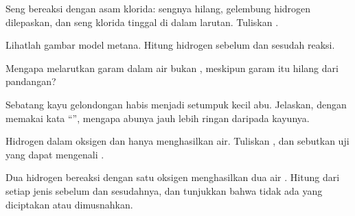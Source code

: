 \begin{exercise}[$\star\star$]\label{exo:g7:chemical-reactions:6}
Seng bereaksi dengan asam klorida: sengnya hilang, gelembung hidrogen
dilepaskan, dan seng klorida tinggal di dalam larutan. Tuliskan
.
\end{exercise}

\begin{exercise}[$\star\star$]\label{exo:g7:chemical-reactions:7}
Lihatlah gambar model  metana. Hitung  hidrogen sebelum
dan sesudah reaksi.
\end{exercise}

\begin{exercise}[$\star\star$]\label{exo:g7:chemical-reactions:8}
Mengapa melarutkan garam dalam air bukan , meskipun garam
itu hilang dari pandangan?
\end{exercise}

\begin{exercise}[$\star\star$]\label{exo:g7:chemical-reactions:9}
Sebatang kayu gelondongan  habis menjadi setumpuk kecil abu.
Jelaskan, dengan memakai kata ``'', mengapa abunya jauh lebih
ringan daripada kayunya.
\end{exercise}

\begin{exercise}[$\star\star$]\label{exo:g7:chemical-reactions:10}
Hidrogen  dalam oksigen dan hanya menghasilkan air. Tuliskan
, dan sebutkan uji yang dapat mengenali .
\end{exercise}

\begin{exercise}[$\star\star\star$]\label{exo:g7:chemical-reactions:11}
Dua  hidrogen  bereaksi dengan satu  oksigen
 menghasilkan dua  air . Hitung  dari
setiap jenis sebelum dan sesudahnya, dan tunjukkan bahwa tidak ada yang
diciptakan atau dimusnahkan.
\end{exercise}

